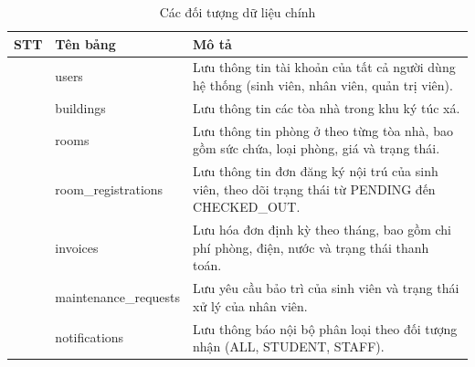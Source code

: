 \documentclass[13pt,a4paper]{extarticle}
\numberwithin{figure}{section}
\numberwithin{table}{section}
\begin{document}
	\begin{table}[H]
		\centering
		\caption{Các đối tượng dữ liệu chính}
		\label{tab:doi-tuong}
		\begingroup
		\setlength{\tabcolsep}{3pt}
		\begin{tabularx}{\textwidth}{|>{\centering\arraybackslash}p{1cm}|>{\raggedright\arraybackslash}p{3.8cm}|Y|}
			\hline
			\centering\textbf{STT} & \centering\textbf{Tên bảng} & \centering\arraybackslash\textbf{Mô tả} \\
			 & users & Lưu thông tin tài khoản của tất cả người dùng hệ thống (sinh viên, nhân viên, quản trị viên). \\
			 & buildings & Lưu thông tin các tòa nhà trong khu ký túc xá. \\
			 & rooms & Lưu thông tin phòng ở theo từng tòa nhà, bao gồm sức chứa, loại phòng, giá và trạng thái. \\
			 & room\_registrations & Lưu thông tin đơn đăng ký nội trú của sinh viên, theo dõi trạng thái từ PENDING đến CHECKED\_OUT. \\
			 & invoices & Lưu hóa đơn định kỳ theo tháng, bao gồm chi phí phòng, điện, nước và trạng thái thanh toán. \\
			 & maintenance\_requests & Lưu yêu cầu bảo trì của sinh viên và trạng thái xử lý của nhân viên. \\
			 & notifications & Lưu thông báo nội bộ phân loại theo đối tượng nhận (ALL, STUDENT, STAFF). \\
			\hline
		\end{tabularx}
		\endgroup
	\end{table}
	
\end{document}
